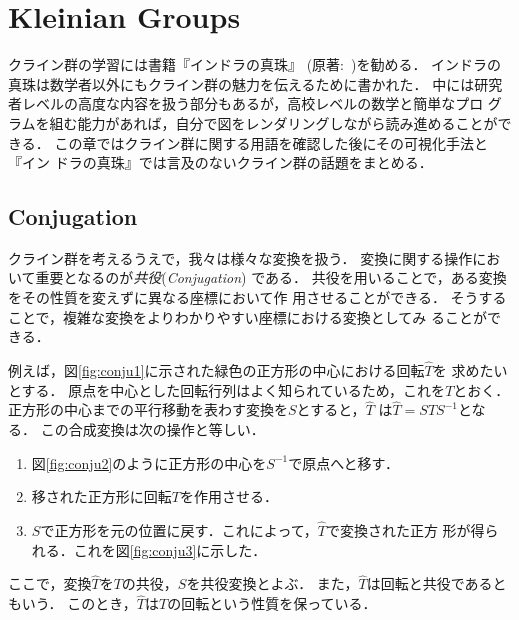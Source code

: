 
\section{Kleinian Groups}

クライン群の学習には書籍『インドラの真珠』\cite{komori-indra201303}
(原著:~\cite{MumfordSeriesWright200204})を勧める．
インドラの真珠は数学者以外にもクライン群の魅力を伝えるために書かれた．
中には研究者レベルの高度な内容を扱う部分もあるが，高校レベルの数学と簡単なプロ
グラムを組む能力があれば，自分で図をレンダリングしながら読み進めることができる．
この章ではクライン群に関する用語を確認した後にその可視化手法と『イン
ドラの真珠』では言及のないクライン群の話題をまとめる．

\subsection{Conjugation}

クライン群を考えるうえで，我々は様々な変換を扱う．
変換に関する操作において重要となるのが\emph{共役}(\textit{Conjugation})
である．
共役を用いることで，ある変換をその性質を変えずに異なる座標において作
用させることができる．
そうすることで，複雑な変換をよりわかりやすい座標における変換としてみ
ることができる．

例えば，図\ref{fig:conju1}に示された緑色の正方形の中心における回転$\hat{T}$を
求めたいとする．
原点を中心とした回転行列はよく知られているため，これを$T$とおく．
正方形の中心までの平行移動を表わす変換を$S$とすると，$\hat{T}$
は$\hat{T} = STS^{-1}$となる．
この合成変換は次の操作と等しい．
\begin{enumerate}
 \item 図\ref{fig:conju2}のように正方形の中心を$S^{-1}$で原点へと移す．
 \item 移された正方形に回転$T$を作用させる．
 \item $S$で正方形を元の位置に戻す．これによって，$\hat{T}$で変換された正方
       形が得られる．これを図\ref{fig:conju3}に示した．
\end{enumerate}
ここで，変換$\hat{T}$を$T$の共役，$S$を共役変換とよぶ．
また，$\hat{T}$は回転と共役であるともいう．
このとき，$\hat{T}$は$T$の回転という性質を保っている．


